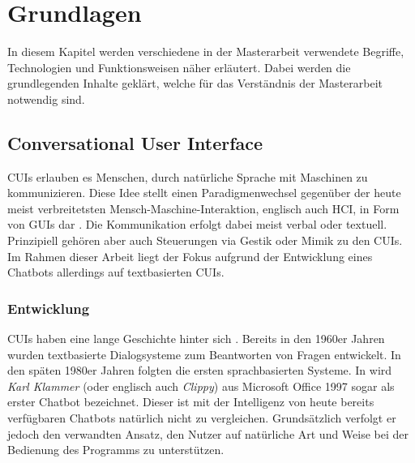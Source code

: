 \chapter{Grundlagen}
\label{cha:grundlagen}

In diesem Kapitel werden verschiedene in der Masterarbeit verwendete Begriffe, Technologien und Funktionsweisen näher erläutert. Dabei werden die grundlegenden Inhalte geklärt, welche für das Verständnis der Masterarbeit notwendig sind.

\section{Conversational User Interface}
\label{sec:conversational-user-interface}

\aclp{CUI} erlauben es Menschen, durch natürliche Sprache mit Maschinen zu kommunizieren. Diese Idee stellt einen Paradigmenwechsel gegenüber der heute meist verbreitetsten Mensch-Maschine-Interaktion, englisch auch \ac{HCI}, in Form von \aclp{GUI} dar \cite{techlabs_what_2017}. Die Kommunikation erfolgt dabei meist verbal oder textuell. Prinzipiell gehören aber auch Steuerungen via Gestik oder Mimik zu den \acp{CUI}. Im Rahmen dieser Arbeit liegt der Fokus aufgrund der Entwicklung eines Chatbots allerdings auf textbasierten \aclp{CUI}.

\subsection{Entwicklung}
\label{subsec:cui-entwicklung}
\aclp{CUI} haben eine lange Geschichte hinter sich \mbox{\cite[S. 51]{mctear_conversational_2016}}. Bereits in den 1960er Jahren wurden textbasierte Dialogsysteme zum Beantworten von Fragen entwickelt. In den späten 1980er Jahren folgten die ersten sprachbasierten Systeme. In \cite[S. 167]{heinemann_neuausrichtung_2018} wird \textit{Karl Klammer} (oder englisch auch \textit{Clippy}) aus Microsoft Office 1997 sogar als erster Chatbot bezeichnet. Dieser ist mit der Intelligenz von heute bereits verfügbaren Chatbots natürlich nicht zu vergleichen. Grundsätzlich verfolgt er jedoch den verwandten Ansatz, den Nutzer auf natürliche Art und Weise bei der Bedienung des Programms zu unterstützen.


